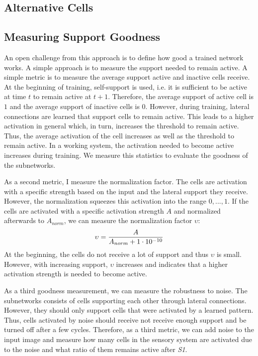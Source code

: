 \subsection{Alternative Cells}




\subsection{Measuring Support Goodness}
An open challenge from this approach is to define how good a trained network works.
A simple approach is to measure the support needed to remain active.
A simple metric is to measure the average support active and inactive cells receive.
At the beginning of training, self-support is used, i.e. it is sufficient to be active at time $t$ to remain active at $t+1$.
Therefore, the average support of active cell is $1$ and the average support of inactive cells is $0$.
However, during training, lateral connections are learned that support cells to remain active.
This leads to a higher activation in general which, in turn, increases the threshold to remain active.
Thus, the average activation of the cell increases as well as the threshold to remain active.
In a working system, the activation needed to become active increases during training.
We measure this statistics to evaluate the goodness of the subnetworks.

As a second metric, I measure the normalization factor.
The cells are activation with a specific strength based on the input and the lateral support they receive.
However, the normalization squeezes this activation into the range $0, ..., 1$.
If the cells are activated with a specific activation strength $A$ and normalized afterwards to $A_{norm}$, we can measure the normalization factor 
$\upsilon$:
\begin{align}\eqlbl{goodness_lat}
	\upsilon = \frac{A}{A_{norm}+1\cdot10^{-10}}
\end{align}
At the beginning, the cells do not receive a lot of support and thus $\upsilon$ is small. However, with increasing support, $\upsilon$ increases and indicates that a higher activation strength is needed to become active.

As a third goodness measurement, we can measure the robustness to noise.
The subnetworks consists of cells supporting each other through lateral connections. However, they should only support cells that were activated by a learned pattern. Thus, cells activated by noise should receive not receive enough support and be turned off after a few cycles.
Therefore, as a third metric, we can add noise to the input image and measure how many cells  in the sensory system are activated due to the noise and what ratio of them remains active after \emph{S1}.





